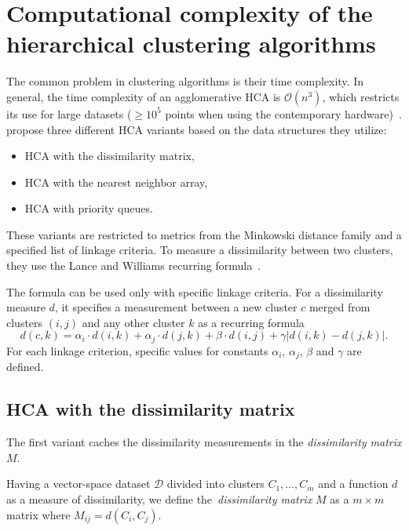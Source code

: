 \section{Computational complexity of the hierarchical clustering algorithms}
\label{sec01:hca}

The common problem in clustering algorithms is their time complexity. In general, the time complexity of an agglomerative HCA is $\mathcal{O}(n^3)$, which restricts its use for large datasets ($\geq10^5$ points when using the contemporary hardware)~\cite{sasirekha2013agglomerative}. \citet{day1984efficient} propose three different HCA variants based on the data structures they utilize:
\begin{itemize}
	\item HCA with the dissimilarity matrix,
	\item HCA with the nearest neighbor array,
	\item HCA with priority queues.
\end{itemize}

These variants are restricted to metrics from the Minkowski distance family and a specified list of linkage criteria. To measure a dissimilarity between two clusters, they use the Lance and Williams recurring formula~\cite{lance1967general,lance1967general2}. 

The formula can be used only with specific linkage criteria. For a dissimilarity measure $d$, it specifies a measurement between a new cluster $c$ merged from clusters $(i,j)$ and any other cluster $k$ as a recurring formula
$$ d(c,k) = \alpha_i\cdot d(i,k) + \alpha_j\cdot d(j,k) + \beta \cdot d(i,j) + \gamma|d(i,k)-d(j,k)|.$$
For each linkage criterion, specific values for constants $\alpha_i$, $\alpha_j$, $\beta$ and $\gamma$ are defined. 

\subsection{HCA with the dissimilarity matrix}

The first variant caches the dissimilarity measurements in the \emph{dissimilarity matrix} $M$.

\begin{defn}
	Having a vector-space dataset $\mathcal{D}$ divided into clusters $C_1,\dots,C_m$ and a function $d$ as a measure of dissimilarity, we define the~\emph{dissimilarity matrix} $M$ as a $m\times m$ matrix where $M_{ij} = d(C_i,C_j)$.
	\label{def01:dismat}
\end{defn}

